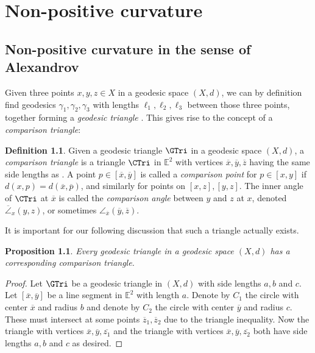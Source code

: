 \documentclass[11pt, a4paper, oneside]{memoir}
\theoremstyle{plain}\newtheorem{theorem}[subsection]{Theorem}
\newtheorem{proposition}[subsection]{Proposition}
\theoremstyle{definition}
\newtheorem{definition}[subsection]{Definition}
\newcommand{\E}{\mathbb{E}}
\begin{document}
\chapter{Non-positive curvature}
\section{Non-positive curvature in the sense of Alexandrov}

Given three points \(x,y,z\in X\) in a geodesic space \((X,d)\), we can by definition find geodesics \(\gamma_1,\gamma_2,\gamma_3\) with lengths \(\ell_1,\ell_2,\ell_3\) between those three points, together forming a 
\textit{geodesic triangle} \GTri.
This gives rise to the concept of a \textit{comparison triangle}:
\begin{definition}
Given a geodesic triangle \(\GTri\) in a geodesic space \((X,d)\), a \textit{comparison triangle} is a triangle \(\CTri\) in \(\E^2\) with vertices \(\overline{x},\overline{y},\overline{z}\) having the same side lengths as \GTri.
A point \(p\in [\overline{x},\overline{y}]\) is called a \textit{comparison point} for \(p\in [x,y]\) if \(d(x,p)=d(\overline{x},\overline{p})\), and similarly for points on \([x,z],[y,z]\).
The inner angle of \(\CTri\) at \(\overline{x}\) is called the \textit{comparison angle} between \(y\) and \(z\) at \(x\), denoted \(\overline{\angle}_x(y,z)\), or sometimes \(\angle_{\overline{x}}(\overline{y},\overline{z})\).
\end{definition}

It is important for our following discussion that such a triangle actually exists.
\begin{proposition}
    Every geodesic triangle in a geodesic space \((X,d)\) has a corresponding comparison triangle.
\end{proposition}
\begin{proof}
    Let \(\GTri\) be a geodesic triangle in \((X,d)\) with side lengths \(a,b\) and \(c\).
    Let \([\overline{x},\overline{y}]\) be a line segment in \(\E^2\) with length \(a\).
    Denote by \(C_1\) the circle with center \(\overline{x}\) and radius \(b\) and denote by \(C_2\) the circle with center \(\overline{y}\) and radius \(c\).
    These must intersect at some points \(\overline{z}_1,\overline{z}_2\) due to the triangle inequality.
    Now the triangle with vertices \(\overline{x},\overline{y},\overline{z_1}\) and the triangle with vertices \(\overline{x},\overline{y},\overline{z_2}\) both have side lengths \(a,b\) and \(c\) as desired.    
\end{proof}
\end{document}
